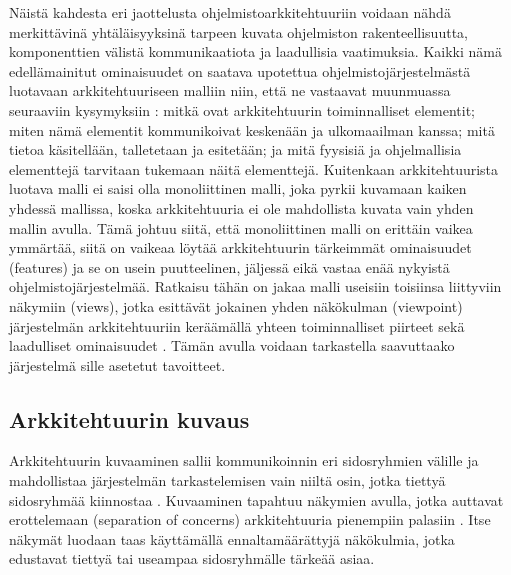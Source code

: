 \documentclass[finnish]{tktltiki2}
\theoremstyle{definition}
\theoremstyle{remark}
\begin{document}
Näistä kahdesta eri jaottelusta ohjelmistoarkkitehtuuriin voidaan nähdä merkittävinä yhtäläisyyksinä tarpeen kuvata ohjelmiston rakenteellisuutta, komponenttien välistä kommunikaatiota ja laadullisia vaatimuksia. Kaikki nämä edellämainitut ominaisuudet on saatava  upotettua ohjelmistojärjestelmästä luotavaan arkkitehtuuriseen malliin niin, että ne vastaavat muunmuassa seuraaviin kysymyksiin \citep[s. 31 - 33]{Rozanski:2011:SSA:2072649}: mitkä ovat arkkitehtuurin toiminnalliset elementit; miten nämä elementit kommunikoivat keskenään ja ulkomaailman kanssa; mitä tietoa käsitellään, talletetaan ja esitetään; ja mitä fyysisiä ja ohjelmallisia elementtejä tarvitaan tukemaan näitä  elementtejä. Kuitenkaan arkkitehtuurista luotava malli ei saisi olla monoliittinen malli, joka pyrkii kuvamaan kaiken yhdessä mallissa, koska arkkitehtuuria ei ole mahdollista kuvata vain yhden mallin avulla. Tämä johtuu siitä, että monoliittinen malli on erittäin vaikea ymmärtää, siitä on vaikeaa löytää arkkitehtuurin tärkeimmät ominaisuudet (features) ja se on usein puutteelinen, jäljessä eikä vastaa enää nykyistä ohjelmistojärjestelmää. Ratkaisu tähän on jakaa malli useisiin toisiinsa liittyviin näkymiin (views), jotka esittävät jokainen yhden näkökulman (viewpoint) järjestelmän arkkitehtuuriin keräämällä yhteen toiminnalliset piirteet sekä laadulliset ominaisuudet \citetext{\citealp[s. 33-34]{Rozanski:2011:SSA:2072649}; \citealp[s. 8-9]{gorton_understanding_2011}; \citealp[s. 117]{Ran:1998:ASV:288408.288438}}. Tämän avulla voidaan tarkastella saavuttaako järjestelmä sille asetetut tavoitteet.


\subsection{Arkkitehtuurin kuvaus}

Arkkitehtuurin kuvaaminen sallii kommunikoinnin eri sidosryhmien välille ja mahdollistaa järjestelmän tarkastelemisen vain niiltä osin, jotka tiettyä sidosryhmää kiinnostaa \citetext{\citealp[s. 329]{ARaHVeSCiSDu}; \citealp[s. 60]{Brondum:2010:TAV:1833335.1833344}}. Kuvaaminen tapahtuu näkymien avulla, jotka auttavat erottelemaan (separation of concerns) arkkitehtuuria pienempiin palasiin \citep[s. 2]{Galster:2011:DTC:2031759.2031761}. Itse näkymät luodaan taas käyttämällä ennaltamäärättyjä näkökulmia, jotka edustavat tiettyä tai useampaa sidosryhmälle tärkeää asiaa. 
\end{document}
